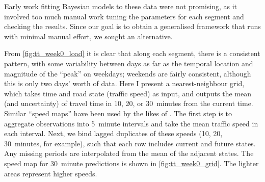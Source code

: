 Early work fitting Bayesian models to these data were not promising, as it involved too much manual work tuning the parameters for each segment and checking the results. Since our goal is to obtain a generalised framework that runs with minimal manual effort, we sought an alternative.

From \cref{fig:tt_week0_load} it is clear that along each segment, there is a consistent pattern, with some variability between days as far as the temporal location and magnitude of the ``peak'' on weekdays; weekends are fairly consistent, although this is only two days' worth of data. Here I present a nearest-neighbour grid, which takes time and road state (traffic speed) as input, and outputs the mean (and uncertainty) of travel time in 10, 20, or 30~minutes from the current time. Similar ``speed maps'' have been used by the likes of \citet{Cathey_2003, Celan_2017, Chen_2014}. The first step is to aggregate observations into 5~minute intervals and take the mean traffic speed in each interval. Next, we bind lagged duplicates of these speeds (10, 20, 30~minutes, for example), such that each row includes current and future states. Any missing periods are interpolated from the mean of the adjacent states. The speed map for 30~minute predictions is shown in \cref{fig:tt_week0_grid}. The lighter areas represent higher speeds.







